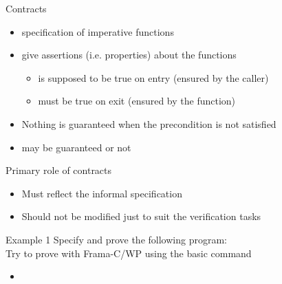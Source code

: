 \begin{frame}{Contracts}
\begin{itemize}
\item {} specification of imperative functions
\item {} give assertions (i.e. properties) about the functions
\begin{itemize}
\item {} is supposed to be true on entry
(ensured by the caller)
\item {} must be true on exit
(ensured by the function) %
\end{itemize}
\item Nothing is guaranteed when the precondition is not satisfied
\item {} may be guaranteed or not 
\end{itemize}
Primary role of contracts
\begin{itemize}
\item Must reflect the informal specification
\item Should not be modified just to suit the verification tasks
\end{itemize}
\end{frame}

\begin{frame}[fragile]{Example 1}
Specify and prove the following program:\\[3mm]

\vspace{3mm}
Try to prove with Frama-C/WP using the basic command\\[3mm]
\begin{itemize} 
\item {}
\end{itemize}
\end{frame}

